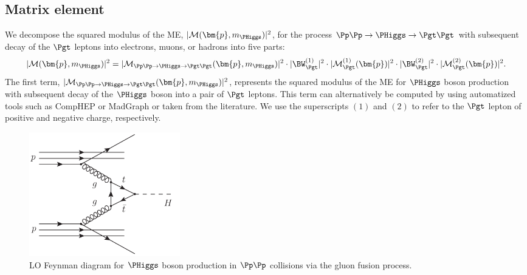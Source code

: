 \subsection{Matrix element}
\label{sec:mem_ME}

We decompose the squared modulus of the ME, $\vert \mathcal{M}(\bm{p},m_{\PHiggs}) \vert^{2}$, for the process $\Pp\Pp \to \PHiggs \to \Pgt\Pgt$
with subsequent decay of the $\Pgt$ leptons into electrons, muons, or
hadrons into five parts:
\begin{equation}
\vert \mathcal{M}(\bm{p},m_{\PHiggs}) \vert^{2} = 
 \vert \mathcal{M}_{\Pp\Pp \to \PHiggs \to
   \Pgt\Pgt}(\bm{p},m_{\PHiggs}) \vert^{2} 
\cdot \vert \BW_{\Pgt}^{(1)} \vert^{2} 
\cdot \vert \mathcal{M}^{(1)}_{\Pgt}(\bm{p}) \vert^{2} 
\cdot \vert \BW_{\Pgt}^{(2)} \vert^{2} 
\cdot \vert \mathcal{M}^{(2)}_{\Pgt}(\bm{p}) \vert^{2} .
 \label{eq:meFactorization}
\end{equation}
The first term, $\vert \mathcal{M}_{\Pp\Pp \to \PHiggs \to
  \Pgt\Pgt}(\bm{p},m_{\PHiggs}) \vert^{2}$, represents the squared
modulus of the ME for $\PHiggs$ boson production with subsequent decay of the $\PHiggs$ boson into a pair of $\Pgt$ leptons.
This term can alternatively be computed by using automatized tools such as CompHEP or MadGraph or taken from the literature.
We use the superscripts $(1)$ and $(2)$ to refer to the $\Pgt$ lepton of positive and negative charge, respectively.

\begin{figure}
\begin{center}
\includegraphics*[height=54mm]{figures/ggH_FeynmanDiagram.pdf}
\end{center}
\caption{
  LO Feynman diagram for $\PHiggs$ boson production in $\Pp\Pp$ collisions via the gluon fusion process.
}
\label{fig:ggH_FeynmanDiagram}
\end{figure}

